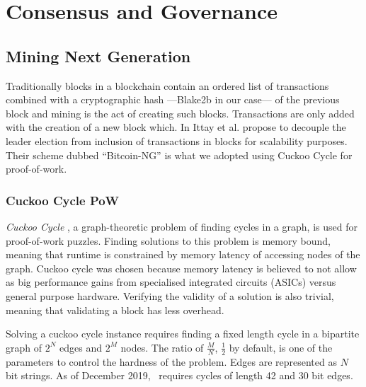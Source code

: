 \section{Consensus and Governance}
\subsection{Mining Next Generation}
\label{sect:mining}

Traditionally blocks in a blockchain contain an ordered list of transactions
combined with a cryptographic hash ---Blake2b \cite{aumasson2013blake2} in our
case--- of the previous block \cite{whatisablockchain,raikwar2019sok} and mining
is the act of creating such blocks. Transactions are only added with the
creation of a new block which. In \cite{Eyal:2016:BSB:2930611.2930615}
Ittay et al. propose to decouple the leader election from inclusion of
transactions in blocks for scalability purposes. Their scheme dubbed
\enquote{Bitcoin-NG} is what we adopted using Cuckoo Cycle for proof-of-work.



\subsubsection{Cuckoo Cycle PoW}

\textit{Cuckoo Cycle} \cite{Tromp2015CuckooCA}, a graph-theoretic problem of
finding cycles in a graph, is used for proof-of-work puzzles. Finding solutions
to this problem is memory bound, meaning that runtime is constrained by memory
latency of accessing nodes of the graph. Cuckoo cycle was chosen because memory
latency is believed to not allow as big performance gains from specialised
integrated circuits (ASICs) versus general purpose hardware. Verifying the
validity of a solution is also trivial, meaning that validating a block has
less overhead.

Solving a cuckoo cycle instance requires finding a fixed length cycle in a
bipartite graph of $2^N$ edges and $2^M$ nodes. The ratio of $\frac{M}{N}$,
$\frac{1}{2}$ by default, is one of the parameters to control the hardness of
the problem. Edges are represented as $N$ bit strings.
As of December 2019, \aet\ requires cycles of length 42 and 30 bit edges.

